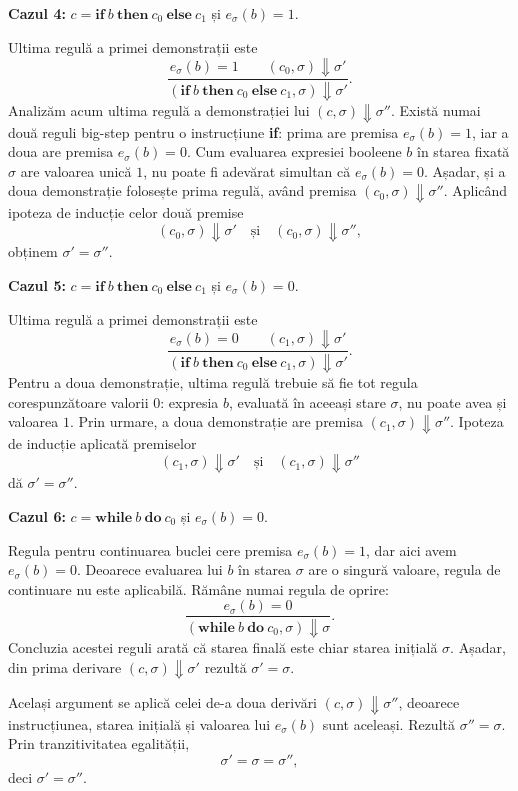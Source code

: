 \textbf{Cazul 4:} $c=\mathbf{if}\ b\ \mathbf{then}\ c_0\
	\mathbf{else}\ c_1$ și $e_\sigma(b)=1$.

Ultima regulă a primei demonstrații este
\[
	\frac{e_\sigma(b)=1 \qquad (c_0,\sigma)\Downarrow\sigma'}
	{(\mathbf{if}\ b\ \mathbf{then}\ c_0\
		\mathbf{else}\ c_1,\sigma)\Downarrow\sigma'}.
\]
Analizăm acum ultima regulă a demonstrației lui
$(c,\sigma)\Downarrow\sigma''$. Există numai două reguli big-step
pentru o instrucțiune \textbf{if}: prima are premisa $e_\sigma(b)=1$,
iar a doua are premisa $e_\sigma(b)=0$. Cum evaluarea expresiei
booleene $b$ în starea fixată $\sigma$ are valoarea unică $1$, nu poate
fi adevărat simultan că $e_\sigma(b)=0$. Așadar, și a doua demonstrație
folosește prima regulă, având premisa
$(c_0,\sigma)\Downarrow\sigma''$. Aplicând ipoteza de inducție celor
două premise
\[
	(c_0,\sigma)\Downarrow\sigma'
	\quad\text{și}\quad
	(c_0,\sigma)\Downarrow\sigma'',
\]
obținem $\sigma'=\sigma''$.

\textbf{Cazul 5:} $c=\mathbf{if}\ b\ \mathbf{then}\ c_0\
	\mathbf{else}\ c_1$ și $e_\sigma(b)=0$.

Ultima regulă a primei demonstrații este
\[
	\frac{e_\sigma(b)=0 \qquad (c_1,\sigma)\Downarrow\sigma'}
	{(\mathbf{if}\ b\ \mathbf{then}\ c_0\
		\mathbf{else}\ c_1,\sigma)\Downarrow\sigma'}.
\]
Pentru a doua demonstrație, ultima regulă trebuie să fie tot regula
corespunzătoare valorii $0$: expresia $b$, evaluată în aceeași stare
$\sigma$, nu poate avea și valoarea $1$. Prin urmare, a doua
demonstrație are premisa $(c_1,\sigma)\Downarrow\sigma''$. Ipoteza de
inducție aplicată premiselor
\[
	(c_1,\sigma)\Downarrow\sigma'
	\quad\text{și}\quad
	(c_1,\sigma)\Downarrow\sigma''
\]
dă $\sigma'=\sigma''$.

\textbf{Cazul 6:} $c=\mathbf{while}\ b\ \mathbf{do}\ c_0$ și
$e_\sigma(b)=0$.

Regula pentru continuarea buclei cere premisa $e_\sigma(b)=1$, dar aici avem
$e_\sigma(b)=0$. Deoarece evaluarea lui $b$ în starea $\sigma$ are o
singură valoare, regula de continuare nu este aplicabilă. Rămâne numai
regula de oprire:
\[
	\frac{e_\sigma(b)=0}
	{(\mathbf{while}\ b\ \mathbf{do}\ c_0,\sigma)\Downarrow\sigma}.
\]
Concluzia acestei reguli arată că starea finală este chiar starea
inițială $\sigma$. Așadar, din prima derivare
$(c,\sigma)\Downarrow\sigma'$ rezultă $\sigma'=\sigma$.

Același argument se aplică celei de-a doua derivări
$(c,\sigma)\Downarrow\sigma''$, deoarece instrucțiunea, starea inițială
și valoarea lui $e_\sigma(b)$ sunt aceleași. Rezultă
$\sigma''=\sigma$. Prin tranzitivitatea egalității,
\[
	\sigma'=\sigma=\sigma'',
\]
deci $\sigma'=\sigma''$.

